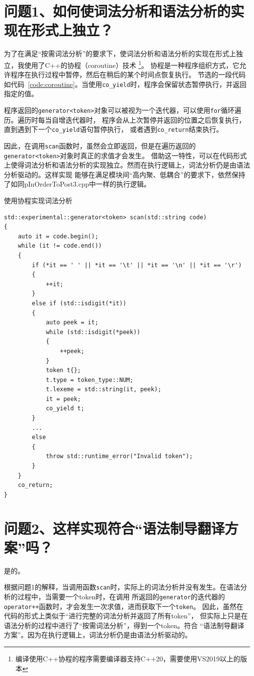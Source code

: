 \documentclass[a4paper,twoside]{article}
\begin{document}
\begin{spacing}{1.2}
\section{问题1、如何使词法分析和语法分析的实现在形式上独立？}

为了在满足“按需词法分析”的要求下，使词法分析和语法分析的实现在形式上独立，我使用了C++的协程（coroutine）技术
\footnote[1]{编译使用C++协程的程序需要编译器支持C++20，需要使用VS2019以上的版本}。
协程是一种程序组织方式，它允许程序在执行过程中暂停，然后在稍后的某个时间点恢复执行。
节选的一段代码如代码~\ref*{code:coroutine}。当使用\texttt{co\_yield}时，程序会保留状态暂停执行，并返回指定的值。

程序返回的\texttt{generator<token>}对象可以被视为一个迭代器，可以使用\texttt{for}循环遍历。遍历时每当自增迭代器时，
程序会从上次暂停并返回的位置之后恢复执行，直到遇到下一个\texttt{co\_yield}语句暂停执行，
或者遇到\texttt{co\_return}结束执行。

因此，在调用\texttt{scan}函数时，虽然会立即返回，但是在遍历返回的\texttt{generator<token>}对象时真正的求值才会发生。
借助这一特性，可以在代码形式上使得词法分析和语法分析的实现独立。然而在执行逻辑上，词法分析仍是由语法分析驱动的。这样实现
能够在满足模块间“高内聚、低耦合”的要求下，依然保持了如同pInOrderToPost3.cpp中一样的执行逻辑。

\begin{listing}[htb]
	\caption{使用协程实现词法分析}
	\label{code:coroutine}
	\begin{verbatim}
std::experimental::generator<token> scan(std::string code)
{
	auto it = code.begin();
	while (it != code.end())
	{
		if (*it == ' ' || *it == '\t' || *it == '\n' || *it == '\r')
		{
			++it;
		}
		else if (std::isdigit(*it))
		{
			auto peek = it;
			while (std::isdigit(*peek))
			{
				++peek;
			}
			token t{};
			t.type = token_type::NUM;
			t.lexeme = std::string(it, peek);
			it = peek;
			co_yield t;
		}
		...
		else
		{
			throw std::runtime_error("Invalid token");
		}
	}
	co_return;
}
	\end{verbatim}
\end{listing}

\section{问题2、这样实现符合“语法制导翻译方案”吗？}

是的。

根据问题1的解释，当调用函数\texttt{scan}时，实际上的词法分析并没有发生。在语法分析的过程中，当需要一个token时，在调用
所返回的\texttt{generator}的迭代器的\texttt{operator++}函数时，才会发生一次求值，进而获取下一个\texttt{token}。
因此，虽然在代码的形式上类似于“进行完整的词法分析并返回了所有token”，
但实际上只是在语法分析的过程中进行了“按需词法分析”，得到一个token。符合
“语法制导翻译方案”。因为在执行逻辑上，词法分析仍是由语法分析驱动的。



\end{spacing}
\end{document}
